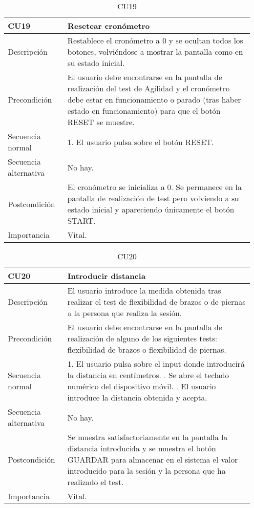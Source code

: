 \begin{table}[H]
\label{CU19}
\begin{center}
\begin{tabular}{| l | p{10cm} |}
\hline
CU19 & Resetear cronómetro\\
\hline
Descripción & Restablece el cronómetro a 0 y se ocultan todos los botones, volviéndose a mostrar la pantalla como en su estado inicial.\\
\hline
Precondición & El usuario debe encontrarse en la pantalla de realización del test de Agilidad y el cronómetro debe estar en funcionamiento o parado (tras haber estado en funcionamiento) para que el botón RESET se muestre.\\
\hline
Secuencia normal & 1. El usuario pulsa sobre el botón RESET.\\
\hline
Secuencia alternativa & No hay.\\
\hline
Postcondición & El cronómetro se inicializa a 0. Se permanece en la pantalla de realización de test pero volviendo a su estado inicial y apareciendo únicamente el botón START.\\
\hline
Importancia & Vital.\\
\hline
\end{tabular}
\end{center}
\caption{CU19}
\end{table}

\begin{table}[H]
\label{CU20}
\begin{center}
\begin{tabular}{| l | p{10cm} |}
\hline
CU20 & Introducir distancia\\
\hline
Descripción & El usuario introduce la medida obtenida tras realizar el test de flexibilidad de brazos o de piernas a la persona que realiza la sesión.\\
\hline
Precondición & El usuario debe encontrarse en la pantalla de realización de alguno de los siguientes tests: flexibilidad de brazos o flexibilidad de piernas.\\
\hline
Secuencia normal & 1. El usuario pulsa sobre el input donde introducirá la distancia en centímetros.
\newline 2. Se abre el teclado numérico del dispositivo móvil.
\newline 3. El usuario introduce la distancia obtenida y acepta.\\
\hline
Secuencia alternativa & No hay.\\
\hline
Postcondición & Se muestra satisfactoriamente en la pantalla la distancia introducida y se muestra el botón GUARDAR para almacenar en el sistema el valor introducido para la sesión y la persona que ha realizado el test.\\
\hline
Importancia & Vital.\\
\hline
\end{tabular}
\end{center}
\caption{CU20}
\end{table}

